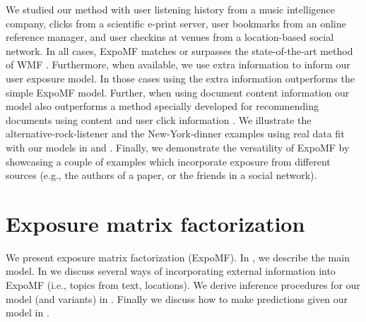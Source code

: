 We studied our method with user listening history from a music intelligence company, clicks from a scientific e-print server, user
bookmarks from an online reference manager, and user checkins at venues from a 
location-based social network. In all cases, ExpoMF matches or surpasses
the state-of-the-art method of \gls{WMF} \citep{hu2008collaborative}. Furthermore, when
available, we use extra information to inform our user exposure model. In those
cases using the extra information outperforms the simple ExpoMF model.
Further, when using document content information our model also
outperforms a method specially developed for recommending documents using content and user click information 
\citep{wang2011collaborative}. We illustrate the
alternative-rock-listener and the New-York-dinner examples using real data fit 
with our models in  and . 
Finally, we demonstrate the versatility of ExpoMF by showcasing a couple of examples which incorporate exposure from different sources (e.g., the authors of a paper, or the friends in a social network). 






\section{Exposure matrix factorization}\label{sec:model}

We present exposure matrix factorization (ExpoMF). 
In , we describe the main model. 
In  we discuss several ways 
of incorporating external information into ExpoMF (i.e., topics from text, locations). 
We derive inference procedures for our model (and variants) in . Finally we discuss how to make predictions given our model in .


